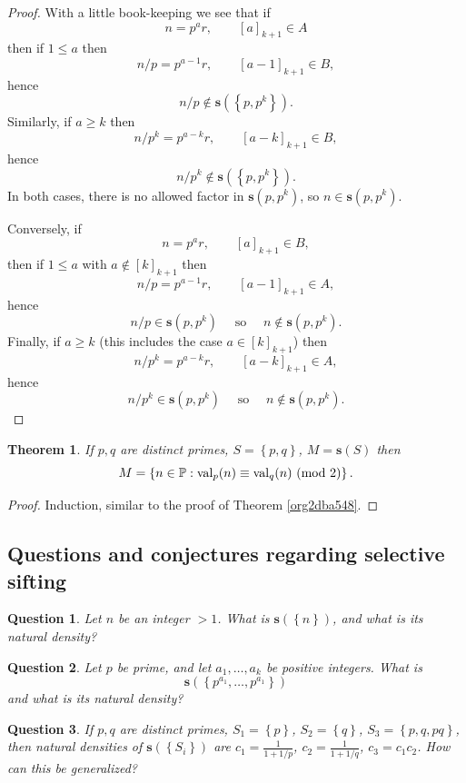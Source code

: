 \documentclass[12pt]{article}
\theoremstyle{definition}
\theoremstyle{remark}
\theoremstyle{plain}
\newtheorem{theorem}[lemma]{Theorem}
\newtheorem{question}{Question}
\newcommand{\modd}[2]{#1\ \textup{(mod }#2\textup{)}}
\newcommand{\set}[1]{\left\{{#1}\right\}}
\newcommand\setsuchas[2]{\left\{{#1}:{#2}\right\}}
\newcommand{\NNp}{{\mathbb{P}}}
\newcommand{\val}{\operatorname{val}}
\newcommand{\ssift}[1]{\mathbf{s}({#1})}
\begin{document}
\begin{proof}
With a little book-keeping we see that if
\[n=p^{a}r, \qquad [a]_{k+1} \in A\]
then if \(1 \le a\) then
\[n/p = p^{a-1}r, \qquad  [a-1]_{k+1} \in B,\]
hence
\[n/p \not \in \ssift{\set{p,p^{k}}}.\]
Similarly,  if
\(a \ge k\) then
\[n/p^{k} = p^{a-k}r, \qquad [a-k]_{k+1} \in B,\]
hence
\[n/p^{k} \not \in \ssift{\set{p,p^{k}}}.\]
In both cases, there is no allowed factor in \(\ssift{p,p^{k}}\), so
\(n \in \ssift{p,p^{k}}\).

Conversely,
if \[n=p^{a}r,\qquad [a]_{k+1} \in B,\] then
if \(1 \le a\) with \(a \not \in [k]_{k+1}\) then
\[n/p = p^{a-1}r,\qquad [a-1]_{k+1} \in A,\]
hence
\[n/p  \in \ssift{p,p^{k}} \quad  \text{ so } \quad n  \not \in \ssift{p,p^{k}}.\]
Finally, if \(a \ge k\) (this includes the case \(a  \in [k]_{k+1}\))
then \[n/p^{k} = p^{a-k}r,\qquad [a-k]_{k+1} \in A,\] hence
\[n/p^{k} \in \ssift{p,p^{k}} \quad \text{ so } \quad n  \not \in \ssift{p,p^{k}}.\]
\end{proof}

\begin{theorem}
If \(p,q\) are distinct primes, \(S=\set{p,q}\), \(M=\ssift{S}\) then
\[M =\setsuchas{n \in \NNp}{\val_{p}(n) \equiv \modd{\val_{q}(n)}{2}}.\]
\end{theorem}
\begin{proof}
Induction, similar to the proof of Theorem \ref{org2dba548}.
\end{proof}
\subsection{Questions and conjectures regarding selective sifting}
\label{sec:org791a854}
\begin{question}
Let \(n\) be an integer \(>1\).
What is \(\ssift{\set{n}}\), and what is its natural density?
\end{question}

\begin{question}
Let \(p\) be prime, and let \(a_{1},\dots,a_{k}\) be positive integers.
What is \[\ssift{\set{p^{a_{1}}, \dots,p^{a_{1}}}}\] and what is its natural density?
\end{question}

\begin{question}
If \(p,q\) are distinct primes, \(S_{1} = \set{p}\), \(S_{2} = \set{q}\), \(S_{3} = \set{p,q,pq}\),
then natural densities of \(\ssift{\set{S_{i}}}\) are \(c_{1}=\frac{1}{1+1/p}\),
\(c_{2}=\frac{1}{1+1/q}\), \(c_{3}=c_{1}c_{2}\). How can this be generalized?
\end{question}
\end{document}
